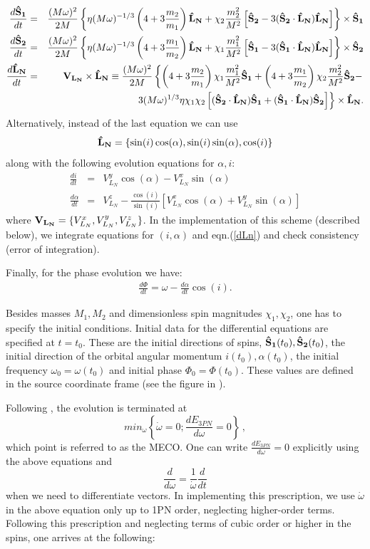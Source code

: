 \documentclass[11pt]{report}
\def\be{\begin{equation}}
\def\ee{\end{equation}}
\def\bea{\begin{eqnarray}}
\def\ena{\end{eqnarray}}
\def\bSo{{\bf \hat{S}_1}}
\def\bSt{{\bf \hat{S}_2}}
\def\bL{{\bf \hat{L}_{N}}}
\begin{document}
\bea
\frac{d\bSo}{dt} &=& \frac{(M\omega)^2}{2M}\left\{ \eta (M\omega)^{-1/3}
\left(4+3\frac{m_2}{m_1}\right)\bL + \chi_2\frac{m_2^2}{M^2}\left[
\bSt - 3(\bSt\cdot\bL)\bL\right]\right\}\times \bSo \\
\frac{d\bSt}{dt} &=& \frac{(M\omega)^2}{2M}\left\{ \eta (M\omega)^{-1/3}
\left(4+3\frac{m_1}{m_2}\right)\bL + \chi_1\frac{m_1^2}{M^2}\left[
\bSo - 3(\bSo \cdot \bL)\bL\right]\right\}\times \bSt\\
\frac{d\bL}{dt} &=& {\bf V_{L_N} }\times\bL \equiv \frac{(M\omega)^2}{2M}
\left\{ \left(4 + 3\frac{m_2}{m_1}\right)\chi_1\frac{m_1^2}{M^2}\bSo +
\left(4 + 3\frac{m_1}{m_2}\right)\chi_2\frac{m_2^2}{M^2}\bSt- \right.
\nonumber\\
&& \left. 3(M\omega)^{1/3}\eta\chi_1\chi_2\left[ (\bSt\cdot\bL)\bSo +
(\bSo \cdot \bL)\bSt \right] \right\}\times\bL .\label{dLn}
\ena
Alternatively, instead of the last equation we can use 
\be
\bL = \{ \sin(i)\cos(\alpha), \sin(i)\sin(\alpha), \cos(i) \}
\ee
along with the following evolution equations for $\alpha, i$:
\bea
\frac{di}{dt} &=& V_{L_N}^{y} \cos(\alpha) - V_{L_N}^{x}\sin(\alpha)\\
\frac{d\alpha}{dt} &=& V_{L_N}^z - \frac{\cos(i)}{\sin(i)}\left[ 
V_{L_N}^{x} \cos(\alpha) + V_{L_N}^{y}\sin(\alpha) \right]
\ena
where ${\bf V_{L_N} } = 
\{ V_{L_N}^{x}, V_{L_N}^{y}, V_{L_N}^{z}\}$.
In the implementation of this scheme (described below), we integrate  
equations for $(i, \alpha)$ and eqn.(\ref{dLn}) and check consistency
(error of integration).

Finally, for the phase evolution we have:
\bea
\frac{d\Phi}{dt} = \omega - \frac{d\alpha}{dt}\cos(i).
\ena 

Besides masses $M_1, M_2$ and dimensionless spin magnitudes $\chi_1, \chi_2$,
one has to specify the initial conditions. Initial data for the differential 
equations are specified at $t=t_0$.  These are the initial directions of spins,
$\bSo(t_0), \bSt(t_0)$, the initial direction of the orbital angular momentum
$i(t_0), \alpha(t_0)$, the initial frequency $\omega_0 = \omega(t_0)$ and
initial phase $\Phi_0 = \Phi(t_0)$. 
These values are defined in the source coordinate frame (see the figure in \cite{BCV2}).

Following \cite{BCV2}, the evolution is terminated at 
\be
min_{\omega}\left\{ \dot{\omega}= 0; \frac{dE_{3PN}}{d\omega} = 0\right\} \, ,
\ee
which point is referred to as the MECO.
One can write $\frac{dE_{3PN}}{d\omega} = 0$ explicitly using the above equations
and 
\be
\frac{d}{d\omega} = \frac{1}{\dot{\omega}} \frac{d}{dt}
\ee
when we need to differentiate vectors. In implementing this prescription, we use $\dot{\omega}$ in the above
equation only up to 1PN order, neglecting higher-order terms. Following this prescription 
and neglecting terms of cubic order or higher in the spins, one arrives at the following:
\end{document}
